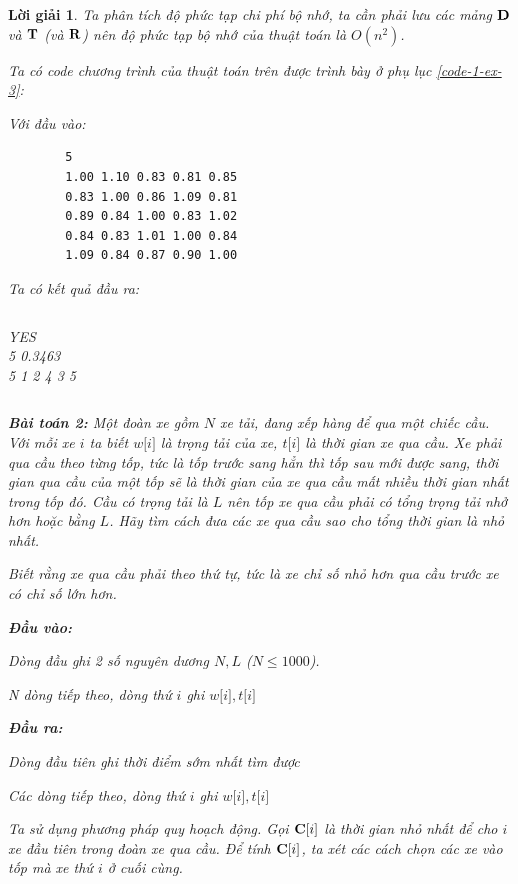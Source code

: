 \documentclass[14pt, a4paper]{article}
\theoremstyle{sltheorem}
\theoremstyle{soltheorem}
\newtheorem*{loigiai}{Lời giải}
\begin{document}
\begin{loigiai}
        Ta phân tích độ phức tạp chi phí bộ nhớ, ta cần phải lưu các mảng $\bold{D}$ và $\bold{T}$ (và $\bold{R}$) nên độ phức tạp bộ nhớ của thuật toán là $O(n^2)$.

        Ta có code chương trình của thuật toán trên được trình bày ở phụ lục \ref{code-1-ex-3}:


    Với đầu vào:
    \begin{verbatim}
        5
        1.00 1.10 0.83 0.81 0.85
        0.83 1.00 0.86 1.09 0.81
        0.89 0.84 1.00 0.83 1.02
        0.84 0.83 1.01 1.00 0.84
        1.09 0.84 0.87 0.90 1.00
    \end{verbatim}
    Ta có kết quả đầu ra:
    \begin{verbatim}
    \end{verbatim}
        YES \\
        5 0.3463 \\
        5 1 2 4 3 5
    \begin{verbatim}
    \end{verbatim}


    \textbf{Bài toán 2:} Một đoàn xe gồm $N$ xe tải, đang xếp hàng để qua một chiếc cầu.
    Với mỗi xe $i$ ta biết $w\lbrack i \rbrack$ là trọng tải của xe, $t\lbrack i \rbrack $ là thời gian xe qua cầu.
    Xe phải qua cầu theo từng tốp, tức là tốp trước sang hẳn thì tốp sau mới được sang,
    thời gian qua cầu của một tốp sẽ là thời gian của xe qua cầu mất nhiều thời gian nhất trong tốp đó.
    Cầu có trọng tải là $L$ nên tốp xe qua cầu phải có tổng trọng tải nhở hơn hoặc bằng $L$.
    Hãy tìm cách đưa các xe qua cầu sao cho tổng thời gian là nhỏ nhất.

    Biết rằng xe qua cầu phải theo thứ tự, tức là xe chỉ số nhỏ hơn qua cầu trước xe có chỉ số lớn hơn.

    \textbf{Đầu vào:} 
    
    Dòng đầu ghi 2 số nguyên dương $N, L$ ($N \leq 1000$). 
    
    N dòng tiếp theo, dòng thứ $i$ ghi $w \lbrack i \rbrack, t \lbrack i \rbrack$
    
    \textbf{Đầu ra:}

    Dòng đầu tiên ghi thời điểm sớm nhất tìm được
    
    Các dòng tiếp theo, dòng thứ $i$ ghi $w \lbrack i \rbrack, t \lbrack i \rbrack $

    Ta sử dụng phương pháp quy hoạch động. Gọi $\bold{C} \lbrack i \rbrack$ là thời gian nhỏ nhất để cho $i$ xe đầu tiên trong đoàn xe qua cầu.
    Để tính $\bold{C} \lbrack i \rbrack$, ta xét các cách chọn các xe vào tốp mà xe  thứ $i$ ở cuối cùng.


\end{loigiai}
\end{document}
